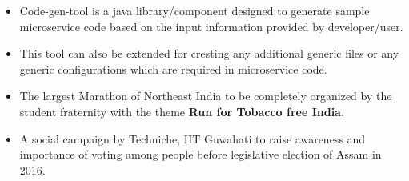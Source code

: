 \documentclass[10pt,a4paper]{altacv}
\begin{document}


\begin{itemize}
  \item \small {Code-gen-tool is a java library/component designed to generate sample microservice code based on the input information provided by developer/user.}
  \item \small {This tool can also be extended for cresting any additional generic files or any generic configurations which are required in microservice code.}
\end{itemize}



\begin{itemize}
  \item \small {The largest Marathon of Northeast India to be completely organized by the student fraternity with the theme \textbf {Run for Tobacco free India}.}
\end{itemize}
\divider


\begin{itemize}
  \item \small {A social campaign by Techniche, IIT Guwahati to raise awareness and importance of voting among people before legislative election of Assam in 2016.}
\end{itemize}
\divider





\end{document}
